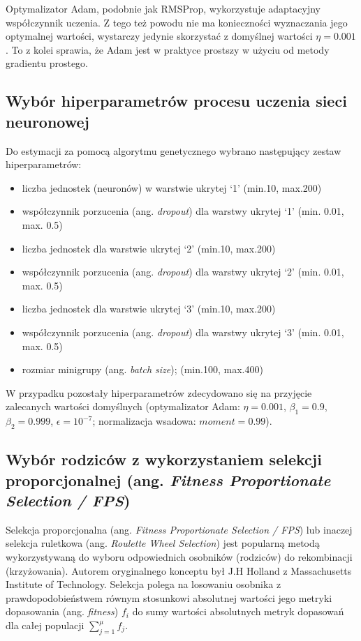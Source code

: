 \documentclass[a4paper,12pt]{article}
\numberwithin{figure}{section}
\begin{document}
    \bigskip

    Optymalizator Adam, podobnie jak RMSProp, wykorzystuje adaptacyjny współczynnik uczenia. Z tego też powodu nie ma konieczności wyznaczania jego optymalnej wartości, wystarczy jedynie skorzystać z domyślnej wartości $\eta = 0.001$\cite{UczenieMaszynowe2018}. To z kolei sprawia, że Adam jest w praktyce prostszy w użyciu od metody gradientu prostego.

    \subsection{Wybór hiperparametrów procesu uczenia sieci neuronowej}

    Do estymacji za pomocą algorytmu genetycznego wybrano następujący zestaw hiperparametrów:
    \begin{itemize}
        \item liczba jednostek (neuronów) w warstwie ukrytej `1' (min.10, max.200)
        \item współczynnik porzucenia (ang. \textit{dropout}) dla warstwy ukrytej `1' (min. 0.01, max. 0.5)
        \item liczba jednostek dla warstwie ukrytej `2' (min.10, max.200)
        \item współczynnik porzucenia (ang. \textit{dropout}) dla warstwy ukrytej `2' (min. 0.01, max. 0.5)
        \item liczba jednostek dla warstwie ukrytej `3' (min.10, max.200)
        \item współczynnik porzucenia (ang. \textit{dropout}) dla warstwy ukrytej `3' (min. 0.01, max. 0.5)
        \item rozmiar minigrupy (ang. \textit{batch size}); (min.100, max.400)
    \end{itemize}

    \bigskip

    W przypadku pozostały hiperparametrów zdecydowano się na przyjęcie zalecanych wartości domyślnych (optymalizator Adam: $\eta = 0.001$, $\beta_{1} = 0.9$, $\beta_{2} = 0.999$, $\epsilon = 10^{-7}$; normalizacja wsadowa: $moment = 0.99$).

    \subsection{Wybór rodziców z wykorzystaniem selekcji proporcjonalnej (ang. \textit{Fitness Proportionate Selection / FPS})}

    Selekcja proporcjonalna (ang. \textit{Fitness Proportionate Selection / FPS}) lub inaczej selekcja ruletkowa (ang. \textit{Roulette Wheel Selection}) jest popularną metodą wykorzystywaną do wyboru odpowiednich osobników (rodziców) do rekombinacji (krzyżowania). Autorem oryginalnego konceptu był J.H Holland z Massachusetts Institute of Technology. Selekcja polega na losowaniu osobnika z prawdopodobieństwem równym stosunkowi absolutnej wartości jego metryki dopasowania (ang. \textit{fitness}) $f_{i}$ do sumy wartości absolutnych metryk dopasowań dla całej populacji $\sum_{j=1}^{\mu} f_{j}$\cite{IntroductionToEvolutionaryComputing2015}.
\end{document}
